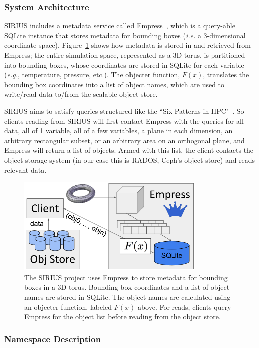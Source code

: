 \subsubsection{System Architecture}

SIRIUS includes a metadata service called Empress~\cite{lawson:pdsw17-empress},
which is a query-able SQLite instance that stores metadata for bounding boxes
({\it i.e.} a 3-dimensional coordinate space).  Figure~\ref{fig:empress} shows
how metadata is stored in and retrieved from Empress; the entire simulation
space, represented as a 3D torus, is partitioned into bounding boxes, whose
coordinates are stored in SQLite for each variable ({\it e.g.}, temperature,
pressure, etc.).  The objecter function, \(F(x)\), translates the bounding box
coordinates into a list of object names, which are used to write/read data
to/from the scalable object store.

SIRIUS aims to satisfy queries structured like the ``Six Patterns in
HPC"~\cite{lofstead:hpdc11-6degrees}. So clients reading from SIRIUS will first
contact Empress with the queries for all data, all of 1 variable, all of a few
variables, a plane in each dimension, an arbitrary rectangular subset, or an
arbitrary area on an orthogonal plane, and Empress will return a list of
objects. Armed with this list, the client contacts the object storage system
(in our case this is RADOS, Ceph's object store) and reads relevant data.

\begin{figure}[tb]
\centering
  \includegraphics[width=90mm]{figures/empress.png}
  \caption{The SIRIUS project uses Empress to store metadata for bounding boxes
in a 3D torus. Bounding box coordinates and a list of object names are stored
in SQLite. The object names are calculated using an objecter function, labeled
\(F(x)\) above. For reads, clients query Empress for the object list before
reading from the object store.}
  \label{fig:empress}
\end{figure}

\subsubsection{Namespace Description}

